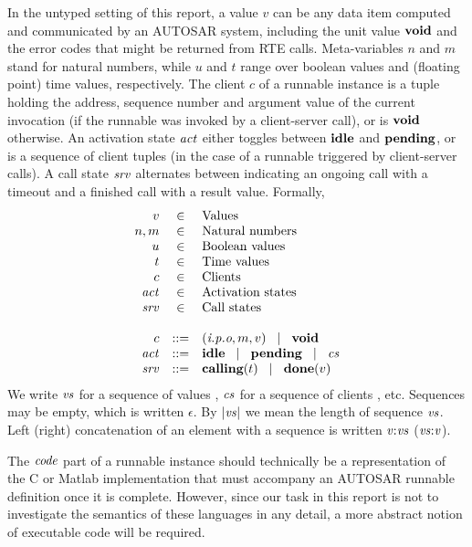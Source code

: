 \documentclass[twocolumn]{article}
\begin{document}
In the untyped setting of this report, a value $v$ can be any data item computed and communicated by an AUTOSAR system, including the unit value $\textbf{void}$ and the error codes that might be returned from RTE calls. Meta-variables $n$ and $m$ stand for natural numbers, while $u$ and $t$ range over boolean values and (floating point) time values, respectively. The client $c$ of a runnable instance is a tuple holding the address, sequence number and argument value of the current invocation (if the runnable was invoked by a client-server call), or is $\textbf{void}$ otherwise. An activation state $\Act$ either toggles between $\textbf{idle}$ and $\textbf{pending}$, or is a sequence of client tuples (in the case of a runnable triggered by client-server calls). A call state $\Srv$ alternates between indicating an ongoing call with a timeout and a finished call with a result value.
Formally,
\[
\begin{array}{rcll}
  v        & \in & \text{Values} \\
  n,m      & \in & \text{Natural numbers} \\
  u        & \in & \text{Boolean values} \\
  t        & \in & \text{Time values} \\
  c        & \in & \text{Clients} \\
  \Act     & \in & \text{Activation states} \\
  \Srv	   & \in & \text{Call states} \\ \\
  c        & ::= & \Tclient {\Top o p i} m v \sep \Tvoid \\
  \Act     & ::= & \Tidle \sep \Tpending \sep \Cs \\
  \Srv	   & ::= & \Tcalling t \sep \Tdone v
\end{array}
\]
We write $\Vs$ for a sequence of values , $\Cs$ for a sequence of clients , etc. Sequences may be empty, which is written $\epsilon$. By $\Tlength{\Vs}$ we mean the length of sequence $\Vs$. Left (right) concatenation of an element with a sequence is written $\Tcons{\V{V}}{\V{Vs}}$ ($\Tsnoc{\V{Vs}}{\V{V}}$).

The $\Code$ part of a runnable instance should technically be a representation of the C or Matlab implementation that must accompany an AUTOSAR runnable definition once it is complete. However, since our task in this report is not to investigate the semantics of these languages in any detail, a more abstract notion of executable code will be required.
\end{document}
